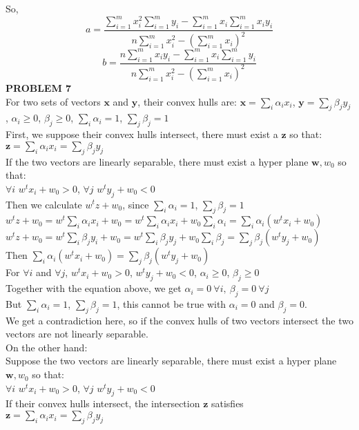 \documentclass[11pt,a4paper,fleqn]{article}
\begin{document}
So, 
$$a=\frac{\sum_{i=1}^{m}x_i^2\sum_{i=1}^{m}y_i-\sum_{i=1}^{m}x_i\sum_{i=1}^{m}x_iy_i}{n\sum_{i=1}^{m}x_i^2-(\sum_{i=1}^{m}x_i)^2}$$
$$b=\frac{n\sum_{i=1}^{m}x_iy_i-\sum_{i=1}^{m}x_i\sum_{i=1}^{m}y_i}{n\sum_{i=1}^{m}x_i^2-(\sum_{i=1}^{m}x_i)^2}$$
\newpage \noindent
\textbf{PROBLEM 7}\\
For two sets of vectors $\mathbf{x}$ and $\mathbf{y}$, their convex hulls are: $\mathbf{x}=\sum_i{\alpha_i x_i}$, $\mathbf{y}=\sum_j{\beta_j y_j}$, $\alpha_i \ge 0$, $\beta_j \ge 0$, $\sum_i{\alpha_i}=1$, $\sum_j{\beta_j}=1$\\
First, we suppose their convex hulls intersect, there must exist a $\mathbf{z}$ so that:\\
$\mathbf{z}=\sum_i{\alpha_i x_i}=\sum_j{\beta_j y_j}$\\
If the two vectors are linearly separable, there must exist a hyper plane $\mathbf{w},w_0$ so that:\\
$\forall i$ $w^tx_i+w_0 > 0$, $\forall j$ $w^ty_j+w_0 < 0$\\
Then we calculate $w^tz+w_0$, since $\sum_i{\alpha_i}=1$, $\sum_j{\beta_j}=1$\\
$w^tz+w_0 = w^t \sum_i{\alpha_i x_i}+w_0=w^t \sum_i{\alpha_i x_i}+w_0\sum_i{\alpha_i}=\sum_i{\alpha_i}(w^t x_i+w_0)$\\
$w^tz+w_0 = w^t \sum_i{\beta_j y_i}+w_0=w^t \sum_i{\beta_j y_j}+w_0\sum_i{\beta_j}=\sum_j{\beta_j}(w^t y_j+w_0)$\\
Then $\sum_i{\alpha_i}(w^t x_i+w_0)=\sum_j{\beta_j}(w^t y_j+w_0)$\\
For $\forall i$ and $\forall j$, $w^tx_i+w_0 > 0$, $w^ty_j+w_0 < 0$, $\alpha_i \ge 0$, $\beta_j \ge 0$\\
Together with the equation above, we get $\alpha_i=0\ \forall i, \ \beta_j = 0\ \forall j$\\
But $\sum_i{\alpha_i}=1$, $\sum_j{\beta_j}=1$, this cannot be true with $\alpha_i=0$ and $\beta_j=0$.\\
We get a contradiction here, so if the convex hulls of two vectors intersect the two vectors are not linearly separable.\\
On the other hand:\\
Suppose the two vectors are linearly separable, there must exist a hyper plane $\mathbf{w},w_0$ so that:\\
$\forall i$ $w^tx_i+w_0 > 0$, $\forall j$ $w^ty_j+w_0 < 0$\\
If their convex hulls intersect, the intersection $\mathbf{z}$ satisfies \\ $\mathbf{z}=\sum_i{\alpha_i x_i}=\sum_j{\beta_j y_j}$\\
\end{document}
